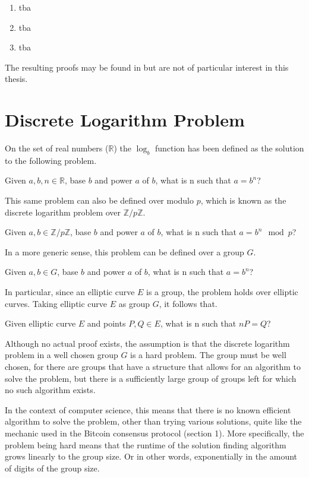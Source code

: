 \begin{prf}
	\begin{enumerate}
		\item tba
		\item tba
		\item tba
	\end{enumerate}
\end{prf}
The resulting proofs may be found in \cite[page 96]{EllipticCurvesBook} but are not of particular interest in this thesis.

\section{Discrete Logarithm Problem}
On the set of real numbers ($\mathbb{R}$) the $\log_b$ function has been defined as the solution to the following problem.
\begin{defn}
	Given $a,b,n\in\mathbb{R}$, base $b$ and power $a$ of $b$, what is n such that $a=b^n$?
\end{defn}
This same problem can also be defined over modulo $p$, which is known as the discrete logarithm problem over $\mathbb{Z}/p\mathbb{Z}$.
\begin{defn}
	Given $a,b\in\mathbb{Z}/p\mathbb{Z}$, base $b$ and power $a$ of $b$, what is n such that $a=b^n\mod{p}$?
\end{defn}
In a more generic sense, this problem can be defined over a group $G$.
\begin{defn}
	Given $a,b\in G$, base $b$ and power $a$ of $b$, what is n such that $a=b^n$?
\end{defn}
In particular, since an elliptic curve $E$ is a group, the problem holds over elliptic curves. Taking elliptic curve $E$ as group $G$, it follows that.
\begin{defn}
	Given elliptic curve $E$ and points $P,Q\in E$, what is n such that $nP=Q$?
\end{defn}
Although no actual proof exists, the assumption is that the discrete logarithm problem in a well chosen group $G$ is a hard problem. The group must be well chosen, for there are groups that have a structure that allows for an algorithm to solve the problem, but there is a sufficiently large group of groups left for which no such algorithm exists.

In the context of computer science, this means that there is no known efficient algorithm to solve the problem, other than trying various solutions, quite like the mechanic used in the Bitcoin consensus protocol (section 1). More specifically, the problem being hard means that the runtime of the solution finding algorithm grows linearly to the group size. Or in other words, exponentially in the amount of digits of the group size.

